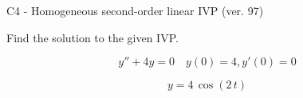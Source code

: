 \begin{exercise}
  \begin{exerciseTitle}C4 - Homogeneous second-order linear IVP (ver. 97)\end{exerciseTitle}
  \begin{exerciseStatement}
    
Find the solution to the given IVP.

    
\[y''+4y = 0 \hspace{1em} y(0) = 4 , y'(0) = 0\]

  \end{exerciseStatement}
  \begin{exerciseAnswer}
    
\[y= 4 \, \cos\left(2 \, t\right)\]

  \end{exerciseAnswer}
\end{exercise}
